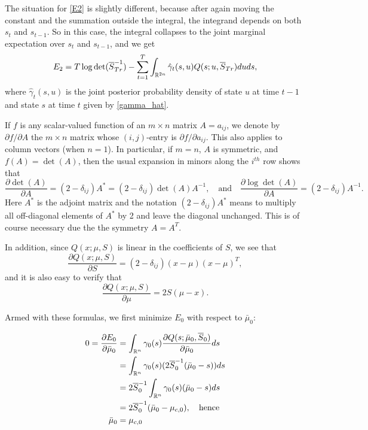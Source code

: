\documentclass[12pt,leqno]{article}
\begin{document}
The situation for \eqref{E2} is slightly different, because after again moving the constant and the summation outside
the integral, the integrand depends on both $s_t$ and $s_{t-1}$.  So in this case, the integral collapses to the 
joint marginal expectation over $s_t$ and $s_{t-1}$, and we get
$$
E_2 = T\log\det(\overline{S}^{-1}_{Tr}) - \sum_{t=1}^T\int_{{\mathbb R}^{2n}}\hat{\gamma}_t(s,u)Q(s;u,\overline{S}_{Tr})duds,
$$
where $\hat{\gamma}_t(s,u)$ is the joint posterior probability density of state $u$ at time $t-1$ and state $s$ 
at time $t$ given by \eqref{gamma_hat}.

If $f$ is any scalar-valued function of an $m\times{n}$ matrix $A = a_{ij}$, we denote by $\partial{f}/\partial{A}$ the 
$m\times{n}$ matrix whose $(i,j)$-entry is $\partial{f}/\partial{a_{ij}}$.  This also applies to column vectors (when $n=1$).
In particular, if $m=n$, $A$ is symmetric, and $f(A) = \det(A)$,  then the usual expansion 
in minors along the $i^{th}$ row shows that 
$$
\frac{\partial{\det(A)}}{\partial{A}} = (2-\delta_{ij})A^* = (2-\delta_{ij})\det(A)A^{-1},\quad\text{and}
\quad\frac{\partial{\log\det(A)}}{\partial{A}} = (2-\delta_{ij})A^{-1}. 
$$
Here $A^*$ is the adjoint matrix and the notation $(2-\delta_{ij})A^*$ means to multiply all off-diagonal elements of $A^*$ by 2
and leave the diagonal unchanged.  This is of course necessary due the the symmetry $A = A^T$.

In addition, since $Q(x;\mu,S)$ is linear in the coefficients of $S$, we see that
$$
\frac{\partial{Q(x;\mu,S)}}{\partial{S}} = (2-\delta_{ij})(x-\mu)(x-\mu)^T,
$$
and it is also easy to verify that
$$
\frac{\partial{Q(x;\mu,S)}}{\partial{\mu}} = 2S(\mu-x).
$$

Armed with these formulas, we first minimize $E_0$ with respect to $\bar{\mu}_0$: 
 
\begin{align}
0 = \frac{\partial{E_0}}{\partial{\bar{\mu}_0}} &= \int_{{\mathbb R}^n}\gamma_0(s)\frac{\partial{Q(s;\bar{\mu}_0,\overline{S}_0)}}{\partial{\bar{\mu}_0}}ds \notag\\
&= \int_{{\mathbb R}^n}\gamma_0(s)(2\overline{S}_0^{-1}(\bar{\mu}_0-s))ds\notag\\
&= 2\overline{S}_0^{-1}\int_{{\mathbb R}^n}\gamma_0(s)(\bar{\mu}_0-s)ds \notag\\
&= 2\overline{S}_0^{-1}(\bar{\mu}_0-\mu_{c,0}), \quad\text{hence}\notag\\
\bar{\mu}_0 &= \mu_{c,0}\label{mu_0}
\end{align}
\end{document}
